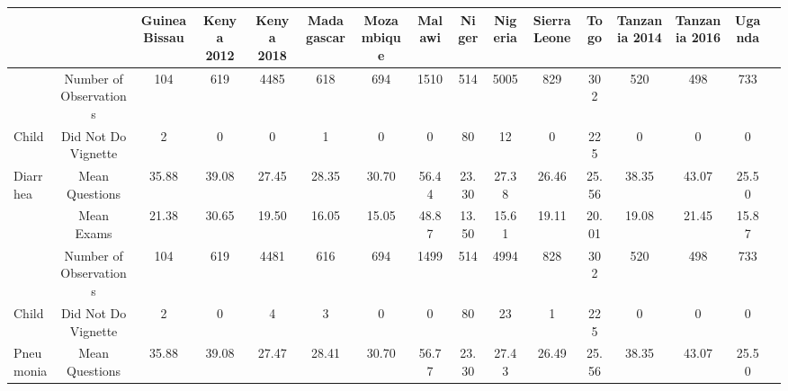 \def\sym#1{\ifmmode^{#1}\else\(^{#1}\)\fi}
\begin{tabular}{l*{15}{c}}
\hline\hline
         &\multicolumn{1}{c}{}&\multicolumn{1}{c}{Guinea Bissau}&\multicolumn{1}{c}{Kenya 2012}&\multicolumn{1}{c}{Kenya 2018}&\multicolumn{1}{c}{Madagascar}&\multicolumn{1}{c}{Mozambique}&\multicolumn{1}{c}{Malawi}&\multicolumn{1}{c}{Niger}&\multicolumn{1}{c}{Nigeria}&\multicolumn{1}{c}{Sierra Leone}&\multicolumn{1}{c}{Togo}&\multicolumn{1}{c}{Tanzania 2014}&\multicolumn{1}{c}{Tanzania 2016}&\multicolumn{1}{c}{Uganda}&\\
\hline
 &                                     {Number of Observations}&       {104}&        {619}&        {4485}&        {618}&        {694}&        {1510}&        {514}&        {5005}&        {829}&        {302}&       {520}&       {498}&       {733}\\
Child&                                 {Did Not Do Vignette}&          {2}&        {0}&        {0}&                {1}&    {0}&                {0}&            {80}&        {12}&        {0}&            {225}&        {0}&            {0}&            {0}\\
Diarrhea&                      {Mean Questions}&                       {35.88}&        {39.08}&    {27.45}&    {28.35}&        {30.70}&        {56.44}&        {23.30}&        {27.38}&        {26.46}&        {25.56}&       {38.35}&       {43.07}&       {25.50}\\
 &                                     {Mean Exams}&                           {21.38}&        {30.65}&    {19.50}&    {16.05}&        {15.05}&        {48.87}&        {13.50}&        {15.61}&        {19.11}&        {20.01}&       {19.08}&       {21.45}&       {15.87}\\
\hline
 &                                     {Number of Observations}&       {104}&        {619}&    {4481}&    {616}&        {694}&        {1499}&        {514}&        {4994}&        {828}&        {302}&       {520}&       {498}&       {733}\\
Child&                         {Did Not Do Vignette}&          {2}&        {0}&        {4}&    {3}&        {0}&            {0}&            {80}&        {23}&        {1}&        {225}&        {0}&            {0}&            {0}\\
Pneumonia&                     {Mean Questions}&                       {35.88}&        {39.08}&    {27.47}&    {28.41}&        {30.70}&        {56.77}&        {23.30}&        {27.43}&        {26.49}&        {25.56}&       {38.35}&       {43.07}&       {25.50}\\

\end{tabular}
